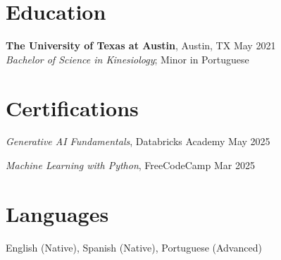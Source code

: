 \documentclass[letterpaper,10pt]{article}
\begin{document}
\section*{Education}
\begin{compactitem}
  \item[]
    \textbf{The University of Texas at Austin}, Austin, TX \hbarfill May 2021 \\
    \textit{Bachelor of Science in Kinesiology}; Minor in Portuguese
\end{compactitem}

\section*{Certifications}
\begin{compactitem}
  \item[]
    \textit{Generative AI Fundamentals}, Databricks Academy \hbarfill May 2025
    \item[]
    \textit{Machine Learning with Python}, FreeCodeCamp \hbarfill Mar 2025
\end{compactitem}

\section*{Languages}
\begin{compactitem}
  \item[]
    English (Native), Spanish (Native), Portuguese (Advanced)
\end{compactitem}
\end{document}
